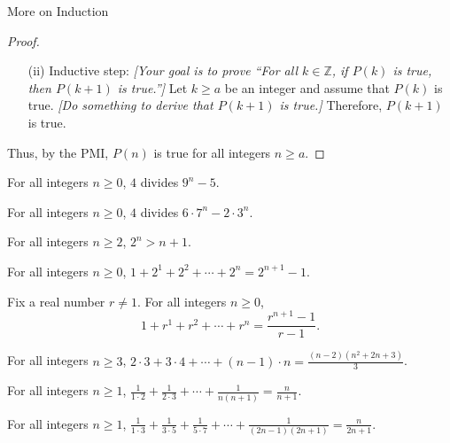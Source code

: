 \begin{section}{More on Induction}
\begin{skeleton}
\begin{center}
{\begin{minipage}{6in}
\begin{proof}
\begin{enumerate}
\item[(ii)] Inductive step:  \emph{[Your goal is to prove ``For all $k\in\mathbb{Z}$, if $P(k)$ is true, then $P(k+1)$ is true.'']} Let $k \ge a$ be an integer and assume that $P(k)$ is true. \emph{[Do something to derive that $P(k+1)$ is true.]} Therefore, $P(k+1)$ is true.
\end{enumerate}
Thus, by the PMI, $P(n)$ is true for all integers $n \ge a$.
\end{proof}
\end{minipage}
}
\end{center}
\end{skeleton}

\begin{theorem}
For all integers $n \ge 0$, $4$ divides $9^n - 5$.
\end{theorem}

\begin{theorem}
For all integers $n \ge 0$, $4$ divides $6\cdot 7^n - 2 \cdot 3^n$.
\end{theorem}

\begin{theorem}
For all integers $n \ge 2$, $2^n > n + 1$.
\end{theorem}

\begin{theorem}
For all integers $n \ge 0$, $1 + 2^1 + 2^2 + \cdots + 2^n = 2^{n+1} - 1$.
\end{theorem}

\begin{theorem}
Fix a real number $r \neq 1$. For all integers $n \ge 0$,
$$\displaystyle{1 + r^1 + r^2 + \cdots + r^n = \frac{r^{n+1} - 1}{r-1}}.$$
\end{theorem}

\begin{theorem}
For all integers $n \ge 3$, $\displaystyle{2\cdot 3 + 3 \cdot 4 + \cdots + (n-1)\cdot n = \frac{(n-2)(n^2+2n+3)}{3}}$.
\end{theorem}

\begin{theorem}
For all integers $n \ge 1$, $\displaystyle{\frac{1}{1\cdot 2} + \frac{1}{2\cdot 3} + \cdots + \frac{1}{n(n+1)} = \frac{n}{n+1}}$.
\end{theorem}

\begin{theorem}
For all integers $n \ge 1$, $\displaystyle{\frac{1}{1\cdot 3} + \frac{1}{3\cdot 5} + \frac{1}{5\cdot7} + \cdots + \frac{1}{(2n-1)(2n+1)} = \frac{n}{2n+1}}$.
\end{theorem}


\end{section}

